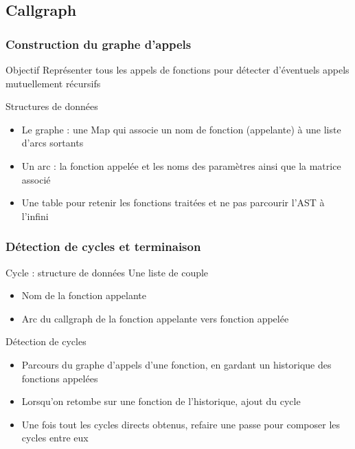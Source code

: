 \subsection{Callgraph}
\begin{frame}
  \frametitle{Construction du graphe d'appels}
  \begin{block}{Objectif}
    Représenter tous les appels de fonctions pour détecter d'éventuels appels mutuellement récursifs
  \end{block}
  \begin{block}{Structures de données}
    \begin{itemize}
    \item Le graphe : une Map qui associe un nom de fonction (appelante) à une liste d'arcs sortants
    \item Un arc : la fonction appelée et les noms des paramètres
      ainsi que la matrice associé
    \item Une table pour retenir les fonctions traitées et ne pas parcourir l'AST à l'infini
    \end{itemize}
  \end{block}
\end{frame}

\begin{frame}
  \frametitle{Détection de cycles et terminaison}
  \begin{block}{Cycle : structure de données}
    Une liste de couple
    \begin{itemize}
    \item Nom de la fonction appelante 
    \item Arc du callgraph de la fonction appelante vers fonction appelée
    \end{itemize}
  \end{block}
  \begin{block}{Détection de cycles}
    \begin{itemize}
    \item Parcours du graphe d'appels d'une fonction, en gardant un
      historique des fonctions appelées
    \item Lorsqu'on retombe sur une fonction de l'historique, ajout du
      cycle
    \item Une fois tout les cycles directs obtenus, refaire une passe
      pour composer les cycles entre eux
    \end{itemize}
  \end{block}
\end{frame}


